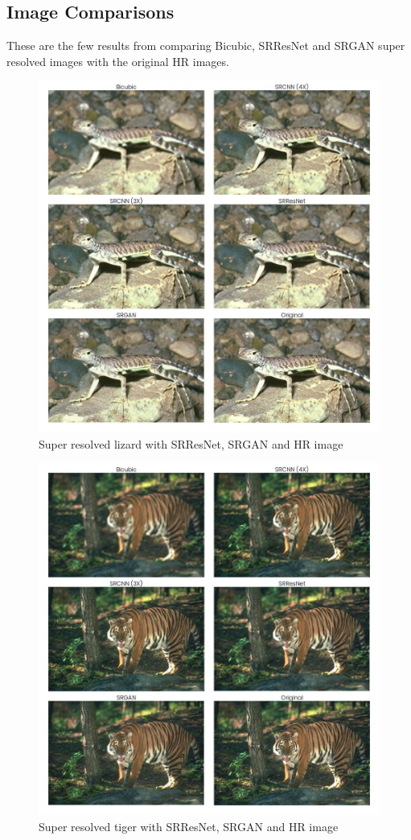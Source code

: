 \subsection{Image Comparisons}
    These are the few results from comparing Bicubic, SRResNet and SRGAN super resolved images with the original HR images.
    \begin{figure}[ht]
        \centering
        \includegraphics[width=5.5in]{./figures/examples/lizard.jpg}
        \caption{Super resolved lizard with SRResNet, SRGAN and HR image}
    \end{figure}
    \newpage
    \begin{figure}
        \centering
        \includegraphics[width=5.5in]{./figures/examples/tiger.jpg}
        \caption{Super resolved tiger with SRResNet, SRGAN and HR image}
    \end{figure}
